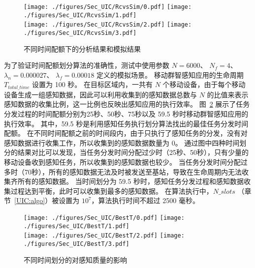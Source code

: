 \begin{figure}[!h]
  \centering
  {\texttt{[image: ./figures/Sec\_UIC/RcvsSim/0.pdf]}}
  {\texttt{[image: ./figures/Sec\_UIC/RcvsSim/1.pdf]}}\\
  {\texttt{[image: ./figures/Sec\_UIC/RcvsSim/2.pdf]}}
  {\texttt{[image: ./figures/Sec\_UIC/RcvsSim/3.pdf]}}
  \vspace{-0.5em}
  \caption{不同时间配额下的分析结果和模拟结果}
  \vspace{-1em}
  \label{Figure_EntireTest}
\end{figure}

为了验证时间配额划分算法的准确性，测试中使用参数 $N=6000$、 $N_f=4$、 $\lambda_n = 0.000027$、 $\lambda_f=0.00018$ 定义的模拟场景。
移动群智感知应用的生命周期 $T_{total\_time}$ 设置为 100 秒。
在目标区域内，一共有 $N$ 个移动设备，由于每个移动设备生成一组感知数据，因此可以利用收集到的感知数据总数与 $N$ 的比值来表示感知数据的收集比例，这一比例也反映出感知应用的执行效率。
图~\ref{Figure_BestT} 展示了任务分发过程的时间配额分别为25秒、50秒、75秒以及 59.5 秒时移动群智感知应用的执行效率。
其中，59.5 秒是利用感知任务执行划分算法找出的最佳任务分发时间配额。
在不同时间配额之前的时间段内，由于只执行了感知任务的分发，没有对感知数据进行收集工作，所以收集到的感知数据数量为 $0$。
通过图中四种时间划分的结果对比可以发现，当任务分发时间分配过少时（25秒、50秒），只有少量的移动设备收到感知任务，所以收集到的感知数据也较少。
当任务分发时间分配过多时（70秒），所有的感知数据无法及时被发送至基站，导致在生命周期内无法收集齐所有的感知数据。
当时间划分为 59.5 秒时，感知任务分发过程和感知数据收集过程达到平衡，此时可以收集到最多的感知数据。
在算法执行中，$N\_slots$ （章节~\ref{UIC:algo}）被设置为 $10^7$，算法执行时间不超过 2500 毫秒。

\begin{figure}[!h]
  \centering
  \vspace{-1.5em}
  {\texttt{[image: ./figures/Sec\_UIC/BestT/0.pdf]}}
  {\texttt{[image: ./figures/Sec\_UIC/BestT/1.pdf]}}\\
  {\texttt{[image: ./figures/Sec\_UIC/BestT/2.pdf]}}
  {\texttt{[image: ./figures/Sec\_UIC/BestT/3.pdf]}}
  \vspace{-0.5em}
  \caption{不同时间划分的对感知质量的影响}
  \vspace{-1em}
  \label{Figure_BestT}
\end{figure}


